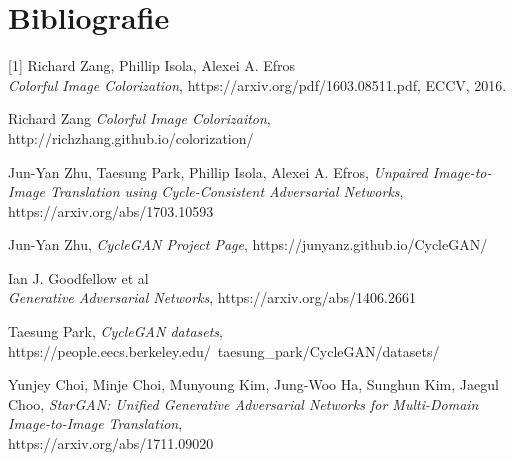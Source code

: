 \documentclass[12pt]{article}
\theoremstyle{definition}
\begin{document}
\section{Bibliografie}

[1] Richard Zang, Phillip Isola, Alexei A. Efros \\ \textit {Colorful Image Colorization}, https://arxiv.org/pdf/1603.08511.pdf, ECCV, 2016. \par
[2] Richard Zang \textit {Colorful Image Colorizaiton}, http://richzhang.github.io/colorization/ \par
[3] Jun-Yan Zhu, Taesung Park, Phillip Isola, Alexei A. Efros, \textit {Unpaired Image-to-Image Translation using Cycle-Consistent Adversarial Networks}, https://arxiv.org/abs/1703.10593 \par
[4] Jun-Yan Zhu, \textit{CycleGAN Project Page}, https://junyanz.github.io/CycleGAN/ \par
[5] Ian J. Goodfellow et al \\ \textit{Generative Adversarial Networks}, https://arxiv.org/abs/1406.2661 \par
[6] Taesung Park, \textit{CycleGAN datasets}, \\ https://people.eecs.berkeley.edu/~taesung\_park/CycleGAN/datasets/ \par
[7] Yunjey Choi, Minje Choi, Munyoung Kim, Jung-Woo Ha, Sunghun Kim, Jaegul Choo, \textit{StarGAN: Unified Generative Adversarial Networks for Multi-Domain Image-to-Image Translation}, \\
https://arxiv.org/abs/1711.09020
\end{document}
